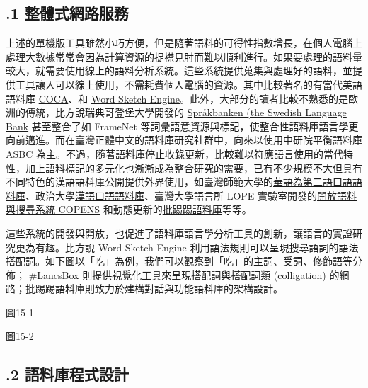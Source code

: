 \subsection{.1 整體式網路服務}

上述的單機版工具雖然小巧方便，但是隨著語料的可得性指數增長，在個人電腦上處理大數據常常會因為計算資源的捉襟見肘而難以順利進行。如果要處理的語料量較大，就需要使用線上的語料分析系統。這些系統提供蒐集與處理好的語料，並提供工具讓人可以線上使用，不需耗費個人電腦的資源。其中比較著名的有當代美語語料庫 \href{https://www.english-corpora.org/coca/}{COCA}、和 \href{https://www.sketchengine.co.uk/}{Word Sketch Engine}。此外，大部分的讀者比較不熟悉的是歐洲的傳統，比方說瑞典哥登堡大學開發的 \href{http://spraakbanken.gu.se/eng}{Språkbanken (the Swedish Language Bank} 甚至整合了如 FrameNet 等詞彙語意資源與標記，使整合性語料庫語言學更向前邁進。而在臺灣正體中文的語料庫研究社群中，向來以使用中研院平衡語料庫 \href{http://asbc.iis.sinica.edu.tw}{ASBC} 為主。不過，隨著語料庫停止收錄更新，比較難以符應語言使用的當代特性，加上語料標記的多元化也漸漸成為整合研究的需要，已有不少規模不大但具有不同特色的漢語語料庫公開提供外界使用，如臺灣師範大學的\href{http://140.122.83.250/cwb_mp3/}{華語為第二語口語語料庫}、政治大學\href{http://140.119.172.200/%20chinese/nuucchi-about.htm}{漢語口語語料庫}、臺灣大學語言所 LOPE 實驗室開發的\href{http://lopen.linguistics.ntu.edu.tw/copens}{開放語料與搜尋系統}\href{http://lopen.linguistics.ntu.edu.tw/copens}{ COPENS} 和動態更新的\href{http://lopen.linguistics.ntu.edu.tw/pttcorp}{批踢踢語料庫}等等。

    這些系統的開發與開放，也促進了語料庫語言學分析工具的創新，讓語言的實證研究更為有趣。比方說 Word Sketch Engine 利用語法規則可以呈現搜尋語詞的語法搭配詞。如下圖以「吃」為例，我們可以觀察到「吃」的主詞、受詞、修飾語等分佈； \href{http://@brezina2018lancsbox}{\#LancsBox} 則提供視覺化工具來呈現搭配詞與搭配詞類 (colligation) 的網路；批踢踢語料庫則致力於建構對話與功能語料庫的架構設計。

  
 

圖15-1

  
 

圖15-2

\subsection{.2 語料庫程式設計}

